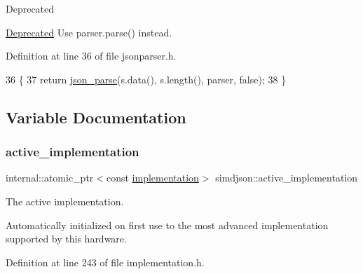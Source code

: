 \begin{DoxyRefDesc}{Deprecated}
\item[\hyperlink{deprecated__deprecated000015}{Deprecated}]Use {\ttfamily parser.\+parse()} instead.\end{DoxyRefDesc}


Definition at line 36 of file jsonparser.\+h.


\begin{DoxyCode}
36                                                                                \{
37   \textcolor{keywordflow}{return} \hyperlink{namespacesimdjson_abda111a8c160cd422c8e5e6d2542f1eb}{json\_parse}(s.data(), s.length(), parser, \textcolor{keyword}{false});
38 \}
\end{DoxyCode}


\subsection{Variable Documentation}
\mbox{\label{namespacesimdjson_a9ed6efb6da2dda95f75256aaf1d0b9b4}} 
\subsubsection{\texorpdfstring{active\+\_\+implementation}{active\_implementation}}
{\footnotesize\ttfamily internal\+::atomic\+\_\+ptr$<$const \hyperlink{classsimdjson_1_1implementation}{implementation}$>$ simdjson\+::active\+\_\+implementation\hspace{0.3cm}{\ttfamily [inline]}}



The active implementation. 

Automatically initialized on first use to the most advanced implementation supported by this hardware. 

Definition at line 243 of file implementation.\+h.

